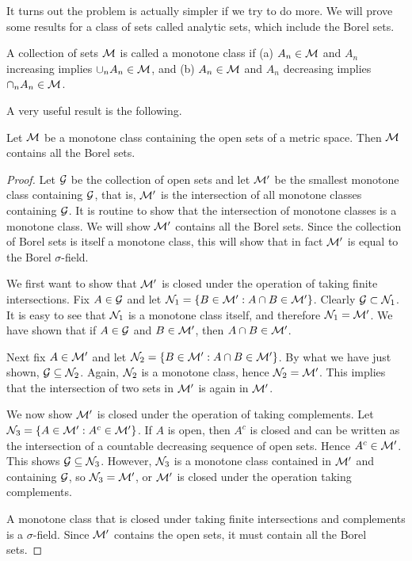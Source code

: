 It turns out the problem is actually simpler if we try to do more. We will prove some results for a class of sets called analytic sets, which include the Borel sets.

A collection of sets $\mathcal{M}$ is called a monotone class if (a) $A_n \in \mathcal{M}$ and $A_n$ increasing implies $\cup_nA_n \in \mathcal{M}$, and (b) $A_n \in \mathcal{M}$ and $A_n$ decreasing implies $\cap_nA_n \in \mathcal{M}$.

A very useful result is the following.

\begin{theorem}\label{thm:ch2_2.1}
Let $\mathcal{M}$ be a monotone class containing the open sets of a metric space. Then $\mathcal{M}$ contains all the Borel sets.
\end{theorem}

\begin{proof}
Let $\mathcal{G}$ be the collection of open sets and let $\mathcal{M}'$ be the smallest monotone class containing $\mathcal{G}$, that is, $\mathcal{M}'$ is the intersection of all monotone classes containing $\mathcal{G}$. It is routine to show that the intersection of monotone classes is a monotone class. We will show $\mathcal{M}'$ contains all the Borel sets. Since the collection of Borel sets is itself a monotone class, this will show that in fact $\mathcal{M}'$ is equal to the Borel $\sigma$-field.

We first want to show that $\mathcal{M}'$ is closed under the operation of taking finite intersections. Fix $A \in \mathcal{G}$ and let $\mathcal{N}_1 = \{B \in \mathcal{M}' : A \cap B \in \mathcal{M}'\}$. Clearly $\mathcal{G} \subset \mathcal{N}_1$. It is easy to see that $\mathcal{N}_1$ is a monotone class itself, and therefore $\mathcal{N}_1 = \mathcal{M}'$. We have shown that if $A \in \mathcal{G}$ and $B \in \mathcal{M}'$, then $A \cap B \in \mathcal{M}'$.

Next fix $A \in \mathcal{M}'$ and let $\mathcal{N}_2 = \{B \in \mathcal{M}' : A \cap B \in \mathcal{M}'\}$. By what we have just shown, $\mathcal{G} \subseteq \mathcal{N}_2$. Again, $\mathcal{N}_2$ is a monotone class, hence $\mathcal{N}_2 = \mathcal{M}'$. This implies that the intersection of two sets in $\mathcal{M}'$ is again in $\mathcal{M}'$.

We now show $\mathcal{M}'$ is closed under the operation of taking complements. Let $\mathcal{N}_3 = \{A \in \mathcal{M}' : A^c \in \mathcal{M}'\}$. If $A$ is open, then $A^c$ is closed and can be written as the intersection of a countable decreasing sequence of open sets. Hence $A^c\in \mathcal{M}'$. This shows $\mathcal{G} \subseteq \mathcal{N}_3$. However, $\mathcal{N}_3$ is a monotone class contained in $\mathcal{M}'$ and containing $\mathcal{G}$, so $\mathcal{N}_3 = \mathcal{M}'$, or $\mathcal{M}'$ is closed under the operation  taking complements.

A monotone class that is closed under taking finite intersections and complements is a $\sigma$-field. Since $\mathcal{M}'$ contains the open sets, it must contain all the Borel sets.
\end{proof}


